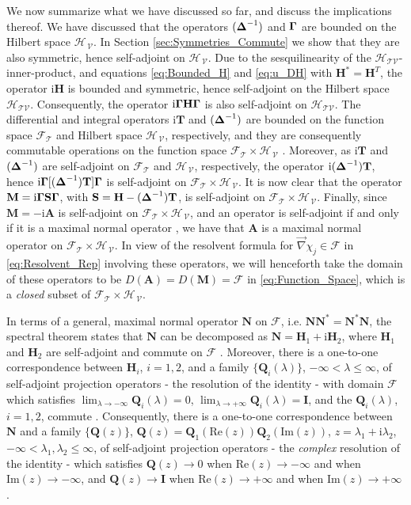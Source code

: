 \documentclass[11pt]{amsart}
\newcommand{\I}{\mathrm{i}}
\newcommand{\Mb}{\mathbf{M}}
\newcommand{\Tb}{\mathbf{T}}
\newcommand{\Hb}{\mathbf{H}}
\newcommand{\Ib}{\mathbf{I}}
\newcommand{\Sb}{\mathbf{S}}
\newcommand{\Ab}{\mathbf{A}}
\newcommand{\Qb}{\mathbf{Q}}
\newcommand{\Nb}{\mathbf{N}}
\newcommand{\Tc}{\mathcal{T}}
\newcommand{\Vc}{\mathcal{V}}
\newcommand{\Hs}{\mathscr{H}}
\newcommand{\Fs}{\mathscr{F}}
\newcommand\bDelta{\mbox{\boldmath${\Delta}$}}
\newcommand\bGamma{\mbox{\boldmath${\Gamma}$}}
\begin{document}
We now summarize what we have discussed so far, and
discuss the implications thereof. We have discussed that the 
operators $(\bDelta^{-1})$ and $\bGamma$ are bounded on the Hilbert
space $\Hs_{\,\Vc}$. In Section \ref{sec:Symmetries_Commute} we show
that they are also symmetric, hence self-adjoint on $\Hs_{\,\Vc}$. Due
to the sesquilinearity of the $\Hs_{\Tc\Vc}$-inner-product, and
equations \eqref{eq:Bounded_H} and \eqref{eq:u_DH} with $\Hb^*=\Hb^T$,
the  operator $\I\Hb$ is bounded and symmetric, hence self-adjoint on
the Hilbert space $\Hs_{\Tc\Vc}$.  Consequently, the operator
$\I\bGamma\Hb\bGamma$ is also self-adjoint on $\Hs_{\Tc\Vc}$. The
differential and integral operators $\I\Tb$ and $(\bDelta^{-1})$ are 
bounded on the function space $\Fs_{\Tc}$ and Hilbert space $\Hs_{\,\Vc}$,
respectively, and they are consequently commutable operations on the
function space $\Fs_{\Tc}\times\Hs_{\,\Vc}$ \cite{Folland:99}. Moreover, as
$\I\Tb$ and $(\bDelta^{-1})$ are self-adjoint on
$\Fs_{\Tc}$ and $\Hs_{\,\Vc}$, respectively, the operator 
$\I(\bDelta^{-1})\Tb$, hence $\I\bGamma[(\bDelta^{-1})\Tb]\bGamma$ is
self-adjoint on $\Fs_{\Tc}\times\Hs_{\,\Vc}$. It is now clear that the operator
$\Mb=\I\bGamma\Sb\bGamma$, with $\Sb=\Hb-(\bDelta^{-1})\Tb$, is
self-adjoint on $\Fs_{\Tc}\times\Hs_{\,\Vc}$. Finally, since $\Mb=-\I\Ab$ is
self-adjoint on $\Fs_{\Tc}\times\Hs_{\,\Vc}$, and an operator is
self-adjoint if and only if it is a maximal normal operator
\cite{Stone:64}, we have that $\Ab$ is a maximal normal
operator on $\Fs_{\Tc}\times\Hs_{\,\Vc}$. In view of the resolvent
formula for $\vec{\nabla}\chi_j\in\Fs$ in \eqref{eq:Resolvent_Rep}
involving these operators, we will henceforth take the domain of
these operators to be $D(\Ab)=D(\Mb)=\Fs$ in
\eqref{eq:Function_Space}, which is a \emph{closed} subset of
$\Fs_{\Tc}\times\Hs_{\,\Vc}$.   





In terms of a general, maximal normal operator $\Nb$ on $\Fs$,
i.e. $\Nb\Nb^*=\Nb^*\Nb$, the spectral theorem states that $\Nb$ can
be decomposed as $\Nb=\Hb_1+\I\Hb_2$, where $\Hb_1$ and $\Hb_2$ are
self-adjoint and commute on $\Fs$ \cite{Stone:64}. Moreover, there is
a one-to-one correspondence between $\Hb_i$, $i=1,2$, and a family
$\{\Qb_i(\lambda)\}$, $-\infty<\lambda\leq\infty$, of self-adjoint projection operators - the
resolution of the identity - with domain $\Fs$ which satisfies
$\lim_{\lambda\to-\infty}\Qb_i(\lambda)=0$, $\lim_{\lambda\to+\infty}\Qb_i(\lambda)=\Ib$, and the
$\Qb_i(\lambda)$, $i=1,2$, commute \cite{Reed-1980,Stone:64}. Consequently,
there is a one-to-one correspondence between $\Nb$ and a family
$\{\Qb(z)\}$, 
$\Qb(z)=\Qb_1(\text{Re}(z))\Qb_2(\text{Im}(z))$, $z=\lambda_1+\I\lambda_2$,
$-\infty<\lambda_1,\lambda_2\leq\infty$, of self-adjoint projection operators - the
\emph{complex} resolution of the identity - which satisfies $\Qb(z)\to0$
when $\text{Re}(z)\to-\infty$  and when $\text{Im}(z)\to-\infty$, and $\Qb(z)\to\Ib$
when $\text{Re}(z)\to+\infty$ and when $\text{Im}(z)\to+\infty$ \cite{Stone:64}.
\end{document}
